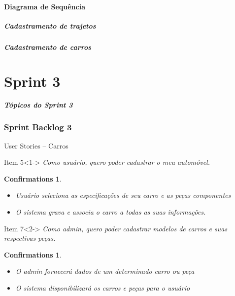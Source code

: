 \documentclass[hyperref={pdfpagelabels=false},11pt]{beamer}
\newtheorem{confirmations}[theorem]{Confirmations}
\begin{document}
			\subsection{Diagrama de Sequência}
				\begin{frame}
					\frametitle{Cadastramento de trajetos}
				\end{frame}	
				
				\pgfdeclareimage[interpolate=true,height=7cm]{seq22}{seq2-2}
				\begin{frame}
					\frametitle{Cadastramento de carros}
					\pgfuseimage{seq22}
				\end{frame}
	\part{Sprint 3}
	
		\begin{frame}
			\frametitle{Tópicos do Sprint 3}
			\tableofcontents[pausesections]
		\end{frame}	
	
		\section{Sprint Backlog 3}
			\begin{frame}{User Stories -- Carros}
				\begin{block}{Item 5}<1->
					\emph{Como usuário, quero poder cadastrar o meu automóvel.}
					\begin{confirmations}
						\begin{itemize}
							\tiny\item{Usuário seleciona as especificações de seu carro e as peças componentes}
							\tiny\item{O sistema grava e associa o carro a todas as suas informações.}
						\end{itemize}
					\end{confirmations}
				\end{block}
				
				\begin{block}{Item 7}<2->
					\emph{Como admin, quero poder cadastrar modelos de carros e suas respectivas peças.}
					\begin{confirmations}
						\begin{itemize}
							\tiny\item{O admin fornecerá dados de um determinado carro ou peça}
							\tiny\item{O sistema disponibilizará os carros e peças para o usuário}
						\end{itemize}
					\end{confirmations}
				\end{block}
			\end{frame}
			
\end{document}
